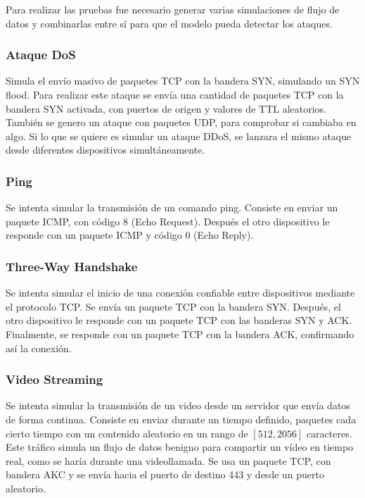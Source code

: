 
Para realizar las pruebas fue necesario generar varias simulaciones de flujo de datos y combinarlas entre sí para que el modelo pueda detectar los ataques.

\subsubsection{Ataque DoS}
\label{subsubsec:AtaqueDoSTCP}
Simula el envío masivo de paquetes TCP con la bandera SYN, simulando un SYN flood. Para realizar este ataque se envía una cantidad de paquetes TCP con la bandera SYN activada, con puertos de origen y valores de TTL aleatorios. También se genero un ataque con paquetes UDP, para comprobar si cambiaba en algo.
Si lo que se quiere es simular un ataque DDoS, se lanzara el mismo ataque desde diferentes dispositivos simultáneamente.

\subsubsection{Ping}
\label{subsubsec:Ping}
Se intenta simular la transmisión de un comando ping. Consiste en enviar un paquete ICMP, con código 8 (Echo Request). Después el otro dispositivo le responde con un paquete ICMP y código 0 (Echo Reply).

\subsubsection{Three-Way Handshake}
\label{subsubsec:ThreeWayHandshake}
Se intenta simular el inicio de una conexión confiable entre dispositivos mediante el protocolo TCP. Se envía un paquete TCP con la bandera SYN. Después, el otro dispositivo le responde con un paquete TCP con las banderas SYN y ACK. Finalmente, se responde con un paquete TCP con la bandera ACK, confirmando así la conexión.

\subsubsection{Video Streaming}
\label{subsubsec:VideoStreaming}
Se intenta simular la transmisión de un video desde un servidor que envía datos de forma continua. Consiste en enviar durante un tiempo definido, paquetes cada cierto tiempo con un contenido aleatorio en un rango de \([512, 2056]\) caracteres. Este tráfico simula un flujo de datos benigno para compartir un vídeo en tiempo real, como se haría durante una videollamada. Se usa un paquete TCP, con bandera AKC y se envía hacia el puerto de destino 443 y desde un puerto aleatorio.
